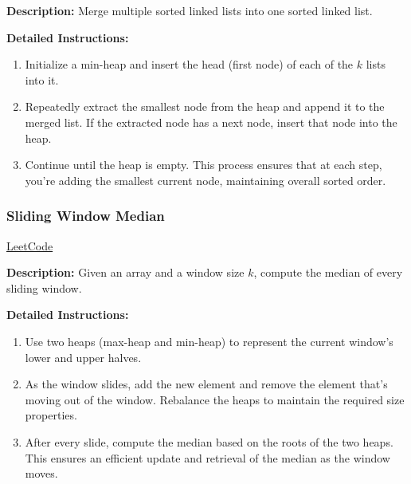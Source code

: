 \textbf{Description:} Merge multiple sorted linked lists into one sorted linked list.

\textbf{Detailed Instructions:}
\begin{enumerate}
    \item Initialize a min-heap and insert the head (first node) of each of the $k$ lists into it.
    \item Repeatedly extract the smallest node from the heap and append it to the merged list. If the extracted node has a next node, insert that node into the heap.
    \item Continue until the heap is empty. This process ensures that at each step, you’re adding the smallest current node, maintaining overall sorted order.
\end{enumerate}

\subsubsection{Sliding Window Median}
\href{https://leetcode.com/problems/sliding-window-median/}{LeetCode}

\textbf{Description:} Given an array and a window size $k$, compute the median of every sliding window.

\textbf{Detailed Instructions:}
\begin{enumerate}
    \item Use two heaps (max-heap and min-heap) to represent the current window’s lower and upper halves.
    \item As the window slides, add the new element and remove the element that’s moving out of the window. Rebalance the heaps to maintain the required size properties.
    \item After every slide, compute the median based on the roots of the two heaps. This ensures an efficient update and retrieval of the median as the window moves.
\end{enumerate}